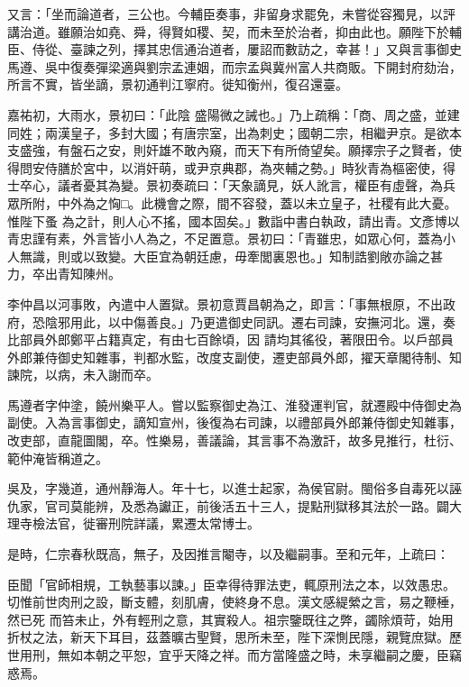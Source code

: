 \begin{pinyinscope}
 又言：「坐而論道者，三公也。今輔臣奏事，非留身求罷免，未嘗從容獨見，以評講治道。雖願治如堯、舜，得賢如稷、契，而未至於治者，抑由此也。願陛下於輔臣、侍從、臺諫之列，擇其忠信通治道者，屢詔而數訪之，幸甚！」又與言事御史馬遵、吳中復奏彈梁適與劉宗孟連姻，而宗孟與冀州富人共商販。下開封府劾治，所言不實，皆坐謫，景初通判江寧府。徙知衡州，復召還臺。



 嘉祐初，大雨水，景初曰：「此陰
 盛陽微之誡也。」乃上疏稱：「商、周之盛，並建同姓；兩漢皇子，多封大國；有唐宗室，出為刺史；國朝二宗，相繼尹京。是欲本支盛強，有盤石之安，則奸雄不敢內窺，而天下有所倚望矣。願擇宗子之賢者，使得問安侍膳於宮中，以消奸萌，或尹京典郡，為夾輔之勢。」時狄青為樞密使，得士卒心，議者憂其為變。景初奏疏曰：「天象謫見，妖人訛言，權臣有虛聲，為兵眾所附，中外為之恟□。此機會之際，間不容發，蓋以未立皇子，社稷有此大憂。惟陛下蚤
 為之計，則人心不搖，國本固矣。」數詣中書白執政，請出青。文彥博以青忠謹有素，外言皆小人為之，不足置意。景初曰：「青雖忠，如眾心何，蓋為小人無識，則或以致變。大臣宜為朝廷慮，毋牽閭裏恩也。」知制誥劉敞亦論之甚力，卒出青知陳州。



 李仲昌以河事敗，內遣中人置獄。景初意賈昌朝為之，即言：「事無根原，不出政府，恐陰邪用此，以中傷善良。」乃更遣御史同訊。遷右司諫，安撫河北。還，奏比部員外郎鄭平占籍真定，有由七百餘頃，因
 請均其徭役，著限田令。以戶部員外郎兼侍御史知雜事，判都水監，改度支副使，遷吏部員外郎，擢天章閣待制、知諫院，以病，未入謝而卒。



 馬遵者字仲塗，饒州樂平人。嘗以監察御史為江、淮發運判官，就遷殿中侍御史為副使。入為言事御史，謫知宣州，後復為右司諫，以禮部員外郎兼侍御史知雜事，改吏部，直龍圖閣，卒。性樂易，善議論，其言事不為激訐，故多見推行，杜衍、範仲淹皆稱道之。



 吳及，字幾道，通州靜海人。年十七，以進士起家，為侯官尉。閩俗多自毒死以誣仇家，官司莫能辨，及悉為讞正，前後活五十三人，提點刑獄移其法於一路。闢大理寺檢法官，徙審刑院詳議，累遷太常博士。



 是時，仁宗春秋既高，無子，及因推言閹寺，以及繼嗣事。至和元年，上疏曰：



 臣聞「官師相規，工執藝事以諫。」臣幸得待罪法吏，輒原刑法之本，以效愚忠。切惟前世肉刑之設，斷支體，刻肌膚，使終身不息。漢文感緹縈之言，易之鞭棰，然已死
 而笞未止，外有輕刑之意，其實殺人。祖宗鑒既往之弊，蠲除煩苛，始用折杖之法，新天下耳目，茲蓋曠古聖賢，思所未至，陛下深惻民隱，親覽庶獄。歷世用刑，無如本朝之平恕，宜乎天降之祥。而方當隆盛之時，未享繼嗣之慶，臣竊惑焉。




\end{pinyinscope}
